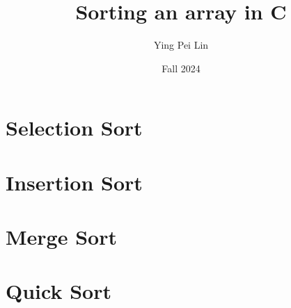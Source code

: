 \documentclass[a4paper,11pt]{article}
\begin{document}
\title{
  \textbf{Sorting an array in C}
}
\author{Ying Pei Lin}
\date{Fall 2024}

\maketitle

\section*{Selection Sort}

\section*{Insertion Sort}

\section*{Merge Sort}

\section*{Quick Sort}
\end{document}
